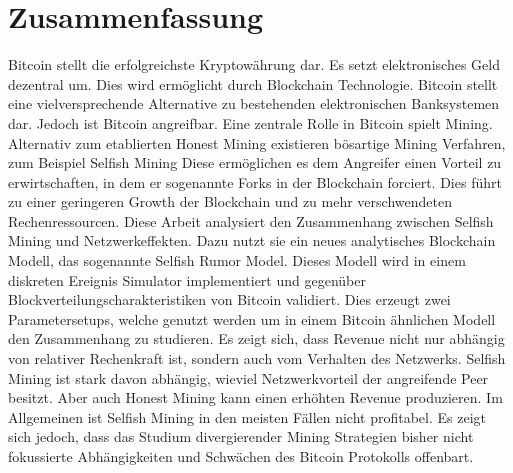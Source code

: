 \chapter*{Zusammenfassung}
Bitcoin stellt die erfolgreichste Kryptowährung dar. Es setzt elektronisches Geld dezentral um. Dies wird ermöglicht durch Blockchain Technologie. Bitcoin stellt eine vielversprechende Alternative zu bestehenden elektronischen Banksystemen dar. Jedoch ist Bitcoin angreifbar. Eine zentrale Rolle in Bitcoin spielt Mining. Alternativ zum etablierten Honest Mining existieren bösartige Mining Verfahren, zum Beispiel Selfish Mining Diese ermöglichen es dem Angreifer einen Vorteil zu erwirtschaften, in dem er sogenannte Forks in der Blockchain forciert. Dies führt zu einer geringeren Growth der Blockchain und zu mehr verschwendeten Rechenressourcen. Diese Arbeit analysiert den Zusammenhang zwischen Selfish Mining und Netzwerkeffekten. Dazu nutzt sie ein neues analytisches Blockchain Modell, das sogenannte Selfish Rumor Model. Dieses Modell wird in einem diskreten Ereignis Simulator implementiert und gegenüber Blockverteilungscharakteristiken von Bitcoin validiert. Dies erzeugt zwei Parametersetups, welche genutzt werden um in einem Bitcoin ähnlichen Modell den Zusammenhang zu studieren. Es zeigt sich, dass Revenue nicht nur abhängig von relativer Rechenkraft ist, sondern auch vom Verhalten des Netzwerks. Selfish Mining ist stark davon abhängig, wieviel Netzwerkvorteil der angreifende Peer besitzt. Aber auch Honest Mining kann einen erhöhten Revenue produzieren. Im Allgemeinen ist Selfish Mining in den meisten Fällen nicht profitabel. Es zeigt sich jedoch, dass das Studium divergierender Mining Strategien bisher nicht fokussierte Abhängigkeiten und Schwächen des Bitcoin Protokolls offenbart.

